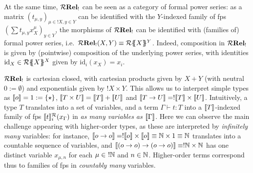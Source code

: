      At the same time, $\mathcal{R}\mathbf{Rel_!}$ can be seen as a category of formal power series: as a matrix $(t_{\mu, y})_{\mu \in !X, y \in Y}$ can be identified with the $Y$-indexed family of fps $(\sum t_{\mu, y} x_X^\mu)_{y \in Y}$, the morphisms of $\mathcal{R}\mathbf{Rel_!}$ can be identified with (families of) formal power series, i.e.~$\mathcal{R}\mathbf{Rel_!}(X,Y)\equiv{\mathcal{R}}\{\!\!\{X\}\!\!\}^Y$.
    Indeed, composition in $\mathcal{R}\mathbf{Rel_!}$ is given by (pointwise) composition of the underlying power series, with identities $\mathrm{id}_X\in  {\mathcal{R}}\{\!\!\{X\}\!\!\}^X$ given by
    $\mathrm{id}_i(x_X)=x_i$.
%    

$\mathcal{R}\mathbf{Rel_!}$ is cartesian closed, with cartesian products given by $X+Y$ (with neutral $0:=\emptyset$) and exponentials given by $!X\times Y$. 
This allows us to interpret simple types as $\llbracket o\rrbracket=1:=\{\star\}$, $\llbracket T\times U\rrbracket=\llbracket T\rrbracket+\llbracket U\rrbracket$ and $\llbracket T\to U\rrbracket=!\llbracket T\rrbracket\times \llbracket U\rrbracket$. Intuitively, a type $T$ translates into a set of variables, and a term $\Gamma\vdash t:T$ into a $\llbracket T\rrbracket$-indexed family of fps $\llbracket t\rrbracket^{\mathcal{R}}_i(x_\Gamma)$ in \emph{as many variables as $\llbracket\Gamma\rrbracket$}.
Here we can observe the main challenge appearing with higher-order types, as these are interpreted by \emph{infinitely many} variables: for instance, $\llbracket o\to o\rrbracket=!\llbracket o\rrbracket\times \llbracket o\rrbracket\equiv\mathbb{N}\times 1\equiv \mathbb{N}$ translates into a countable sequence of variables, and 
$\llbracket(o\to o)\to (o\to o)\rrbracket\equiv !\mathbb{N}\times\mathbb{N}$ has one distinct variable $x_{\mu,n}$ for each $\mu\in \ !\mathbb{N}$ and $n\in \mathbb{N}$.
Higher-order terms correspond thus to families of fps in \emph{countably many} variables.





